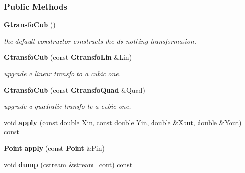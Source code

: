 \subsubsection*{Public Methods}
\begin{CompactItemize}
\item 
{}
{\bf Gtransfo\-Cub} ()\label{class_gtransfocub_a0}

\begin{CompactList}\small\item\em the default constructor constructs the do-nothing transformation.\item\end{CompactList}\item 
{}
{\bf Gtransfo\-Cub} (const {\bf Gtransfo\-Lin} \&Lin)\label{class_gtransfocub_a1}

\begin{CompactList}\small\item\em upgrade a linear transfo to a cubic one.\item\end{CompactList}\item 
{}
{\bf Gtransfo\-Cub} (const {\bf Gtransfo\-Quad} \&Quad)\label{class_gtransfocub_a2}

\begin{CompactList}\small\item\em upgrade a quadratic transfo to a cubic one.\item\end{CompactList}\item 
{}
void {\bf apply} (const double Xin, const double Yin, double \&Xout, double \&Yout) const\label{class_gtransfocub_a3}

\item 
{}
{\bf Point} {\bf apply} (const {\bf Point} \&Pin)\label{class_gtransfocub_a4}

\item 
{}
void {\bf dump} (ostream \&stream=cout) const\label{class_gtransfocub_a5}


\end{CompactItemize}
